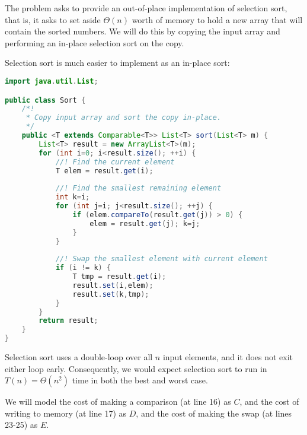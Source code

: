 \documentclass[a4paper,12pt]{article}
\begin{document}

The problem asks to provide an out-of-place implementation of selection sort, that is, it asks to set aside  
 $\Theta(n)$ worth of memory to hold a new array that will contain the sorted numbers. We will do this by 
 copying the input array and performing an in-place selection sort on the copy.
 
 Selection sort is much easier to implement as an in-place sort:

\begin{lstlisting}[language=Java]
import java.util.List;

public class Sort {
	/*!
	 * Copy input array and sort the copy in-place.
	 */
	public <T extends Comparable<T>> List<T> sort(List<T> m) {
		List<T> result = new ArrayList<T>(m);
		for (int i=0; i<result.size(); ++i) {
			//! Find the current element
			T elem = result.get(i);
			
			//! Find the smallest remaining element
			int k=i;
			for (int j=i; j<result.size(); ++j) {
				if (elem.compareTo(result.get(j)) > 0) {
					elem = result.get(j); k=j;
				}
			}
			
			//! Swap the smallest element with current element
			if (i != k) {
				T tmp = result.get(i);
				result.set(i,elem);
				result.set(k,tmp);
			}
		}
		return result;
	}
}
\end{lstlisting}

Selection sort uses a double-loop over all $n$ input elements, and it does not exit 
either loop early. Consequently, we would expect selection sort to run in $T(n) = \Theta(n^2)$ time
in both the best and worst case.

We will model the cost of making a comparison (at line 16) as $C$, and the cost of writing to 
memory (at line 17) as $D$, and the cost of making the swap (at lines 23-25) as $E$. 
\end{document}
